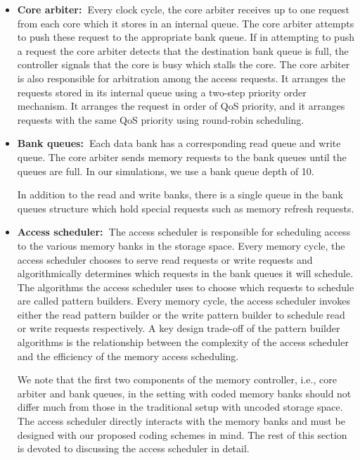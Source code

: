 \begin{itemize}
\item \textbf{Core arbiter:~}Every clock cycle, the core arbiter receives up to one request from each core which it stores in an internal queue. The core arbiter attempts to push these request to the appropriate bank queue. If in attempting to push a request the core arbiter detects that the destination bank queue is full, the controller signals that the core is busy which stalls the core. The core arbiter is also responsible for arbitration among the access requests. It arranges the requests stored in its internal queue using a two-step priority order mechanism. It arranges the request in order of QoS priority, and it arranges requests with the same QoS priority using round-robin scheduling.
\item \textbf{Bank queues:~}Each data bank has a corresponding read queue and write queue.  The core arbiter sends memory requests to the bank queues until the queues are full. In our simulations, we use a bank queue depth of 10. 

In addition to the read and write banks, there is a single queue in the bank queues structure which hold special requests such as memory refresh requests.
\item \textbf{Access scheduler:~}The access scheduler is responsible for scheduling access to the various memory banks in the storage space. Every memory cycle, the access scheduler chooses to serve read requests or write requests and algorithmically determines which requests in the bank queues it will schedule. The algorithms the access scheduler uses to choose which requests to schedule are called pattern builders. Every memory cycle, the access scheduler invokes either the read pattern builder or the write pattern builder to schedule read or write requests respectively. A key design trade-off of the pattern builder algorithms is the relationship between the complexity of the access scheduler and the efficiency of the memory access scheduling.

We note that the first two components of the memory controller, i.e., core arbiter and bank queues, in the setting with coded memory banks should not differ much from those in the traditional setup with uncoded storage space. The access scheduler directly interacts with the memory banks and must be designed with our proposed coding schemes in mind. The rest of this section is devoted to discussing the access scheduler in detail.
\end{itemize}


